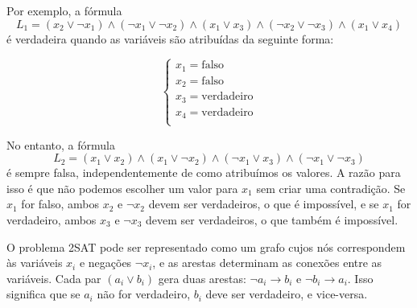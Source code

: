 Por exemplo, a fórmula
\[
L_1 = (x_2 \lor \lnot x_1) \land
      (\lnot x_1 \lor \lnot x_2) \land
      (x_1 \lor x_3) \land
      (\lnot x_2 \lor \lnot x_3) \land
      (x_1 \lor x_4)
\]
é verdadeira quando as variáveis são atribuídas da seguinte forma:

\[
\begin{cases}
x_1 = \textrm{falso} \\
x_2 = \textrm{falso} \\
x_3 = \textrm{verdadeiro} \\
x_4 = \textrm{verdadeiro} \\
\end{cases}
\]

No entanto, a fórmula
\[
L_2 = (x_1 \lor x_2) \land
      (x_1 \lor \lnot x_2) \land
      (\lnot x_1 \lor x_3) \land
      (\lnot x_1 \lor \lnot x_3)
\]
é sempre falsa, independentemente de como
atribuímos os valores.
A razão para isso é que não podemos
escolher um valor para $x_1$
sem criar uma contradição.
Se $x_1$ for falso, ambos $x_2$ e $\lnot x_2$
devem ser verdadeiros, o que é impossível,
e se $x_1$ for verdadeiro, ambos $x_3$ e $\lnot x_3$
devem ser verdadeiros, o que também é impossível.

O problema 2SAT pode ser representado como um grafo
cujos nós correspondem às
variáveis $x_i$ e negações $\lnot x_i$,
e as arestas determinam as conexões
entre as variáveis.
Cada par $(a_i \lor b_i)$ gera duas arestas:
$\lnot a_i \to b_i$ e $\lnot b_i \to a_i$.
Isso significa que se $a_i$ não for verdadeiro,
$b_i$ deve ser verdadeiro, e vice-versa.

